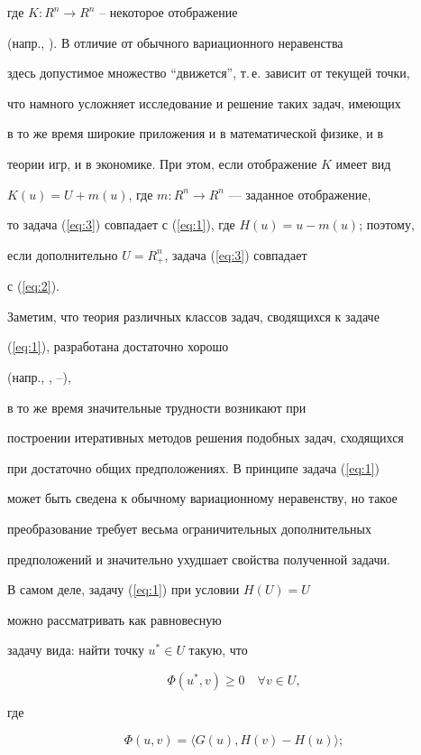 где $K: R^{n} \rightarrow R^{n}$ -- некоторое отображение 


(напр., \cite{Mos76}). В отличие от обычного вариационного неравенства 


здесь допустимое множество ``движется'', т.\,е. зависит от текущей точки, 


что намного усложняет исследование и решение таких задач, имеющих 


в то же время широкие приложения и в математической физике, и в 


теории игр, и в экономике. При этом, если отображение $K$ имеет вид 


$K(u)=U+m(u)$, где $m: R^{n} \rightarrow R^{n}$ --- заданное отображение, 


то задача (\ref{eq:3}) совпадает с (\ref{eq:1}), где $H(u)=u-m(u)$; поэтому, 


если дополнительно $U=R_{+}^{n}$, задача (\ref{eq:3}) совпадает 


с (\ref{eq:2}).





Заметим, что теория различных классов задач, сводящихся к задаче 


(\ref{eq:1}), разработана достаточно хорошо 


(напр., \cite{NNR93}, \cite{HP90}--\cite{PY95}), 


в то же время значительные трудности возникают при 


построении итеративных методов решения подобных задач, сходящихся 


при достаточно общих предположениях. В принципе задача (\ref{eq:1}) 


может быть сведена к обычному вариационному неравенству, но такое 


преобразование требует весьма ограничительных дополнительных 


предположений и значительно ухудшает свойства полученной задачи. 


В самом деле, задачу (\ref{eq:1}) при условии $H(U)=U$


можно рассматривать как равновесную 


задачу вида: найти точку $u^{*} \in U$ такую, что 


$$


\Phi(u^{*}, v) \geq 0 \quad \forall v \in U,


$$


где 


\begin{equation} \label{eq:4} 


\Phi(u, v)=\langle G(u), H(v) - H(u) \rangle ;


\end{equation}


